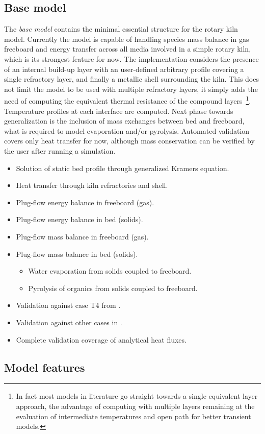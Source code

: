 \documentclass[11pt]{paper}
\newcommand{\openitem}{\item[$\square$]}
\newcommand{\markitem}{\item[$\boxtimes$]}
\begin{document}
\subsection*{Base model}

The \emph{base model} contains the minimal essential structure for the rotary kiln model. Currently the model is capable of handling species mass balance in gas freeboard and energy transfer across all media involved in a simple rotary kiln, which is its strongest feature for now. The implementation considers the presence of an internal build-up layer with an user-defined arbitrary profile covering a single refractory layer, and finally a metallic shell surrounding the kiln. This does not limit the model to be used with multiple refractory layers, it simply adds the need of computing the equivalent thermal resistance of the compound layers~\footnote{In fact most models in literature go straight towards a single equivalent layer approach, the advantage of computing with multiple layers remaining at the evaluation of intermediate temperatures and open path for better transient models.}. Temperature profiles at each interface are computed. Next phase towards generalization is the inclusion of mass exchanges between bed and freeboard, what is required to model evaporation and/or pyrolysis. Automated validation covers only heat transfer for now, although mass conservation can be verified by the user after running a simulation.

\begin{itemize}
\markitem Solution of static bed profile through generalized Kramers equation.
\markitem Heat transfer through kiln refractories and shell.
\markitem Plug-flow energy balance in freeboard (gas).
\markitem Plug-flow energy balance in bed (solids).
\markitem Plug-flow mass balance in freeboard (gas).
\openitem Plug-flow mass balance in bed (solids).
\begin{itemize}
    \openitem Water evaporation from solids coupled to freeboard.
    \openitem Pyrolysis of organics from solids coupled to freeboard.
\end{itemize}
\markitem Validation against case {T4} from \textcite{Barr1986PhD}.
\openitem Validation against other cases in \textcite{Hanein2017}.
\openitem Complete validation coverage of analytical heat fluxes.
\end{itemize}

\subsection*{Model features}
\end{document}
